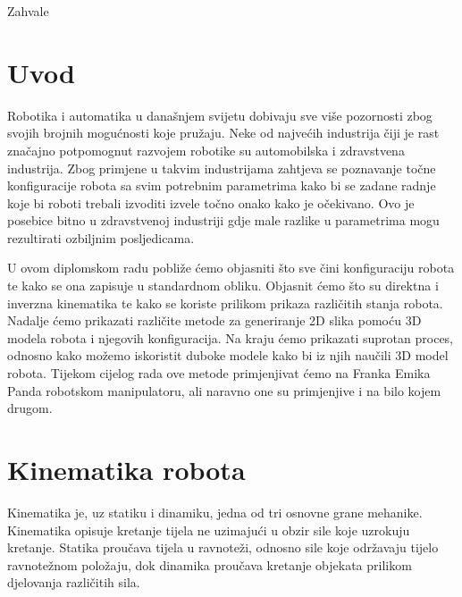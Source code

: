 \documentclass[times, utf8, diplomskirad]{fer}
\begin{document}

\begin{zahvale}
    Zahvale
\end{zahvale}


\mainmatter
{}


\tableofcontents

\setcounter{page}{1}
\mainmatter

\chapter{Uvod}
\label{pog:uvod}
\hspace{\parindent}Robotika i automatika u današnjem svijetu dobivaju sve više pozornosti zbog svojih brojnih mogućnosti koje pružaju.
Neke od najvećih industrija čiji je rast značajno potpomognut razvojem robotike su automobilska i zdravstvena industrija.
Zbog primjene u takvim industrijama zahtjeva se poznavanje točne konfiguracije robota sa svim potrebnim parametrima kako
bi se zadane radnje koje bi roboti trebali izvoditi izvele točno onako kako je očekivano.
Ovo je posebice bitno u zdravstvenoj industriji gdje male razlike u parametrima mogu rezultirati ozbiljnim posljedicama.

U ovom diplomskom radu pobliže ćemo objasniti što sve čini konfiguraciju robota te kako se ona zapisuje u standardnom obliku.
Objasnit ćemo što su direktna i inverzna kinematika te kako se koriste prilikom prikaza različitih stanja robota.
Nadalje ćemo prikazati različite metode za generiranje 2D slika pomoću 3D modela robota i njegovih konfiguracija.
Na kraju ćemo prikazati suprotan proces, odnosno kako možemo iskoristit duboke modele kako bi iz njih naučili 3D model robota.
Tijekom cijelog rada ove metode primjenjivat ćemo na Franka Emika Panda robotskom manipulatoru, ali naravno one su primjenjive i na bilo kojem drugom.

\chapter{Kinematika robota}
Kinematika je, uz statiku i dinamiku, jedna od tri osnovne grane mehanike.
Kinematika opisuje kretanje tijela ne uzimajući u obzir sile koje uzrokuju kretanje.
Statika proučava tijela u ravnoteži, odnosno sile koje održavaju tijelo ravnotežnom položaju, dok dinamika proučava kretanje objekata prilikom djelovanja različitih sila.
\end{document}
